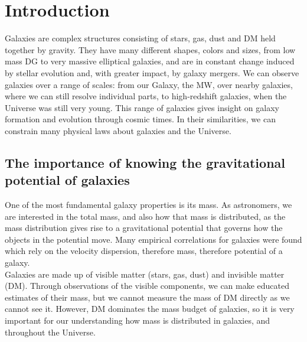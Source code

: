 \section{Introduction}\label{sec:Intro}
Galaxies are complex structures consisting of stars, gas, dust and \ac{DM} held together by gravity. They have many different shapes, colors and sizes, from low mass \ac{DG} to very massive elliptical galaxies, and are in constant change induced by stellar evolution and, with greater impact, by galaxy mergers. We can observe galaxies over a range of scales: from our Galaxy, the \ac{MW}, over nearby galaxies, where we can still resolve individual parts, to high-redshift galaxies, when the Universe was still very young. This range of galaxies gives insight on galaxy formation and evolution through cosmic times. In their similarities, we can constrain many physical laws about galaxies and the Universe. 

\subsection{The importance of knowing the gravitational potential of galaxies}
One of the most fundamental galaxy properties is its mass. As astronomers, we are interested in the total mass, and also how that mass is distributed, as the mass distribution gives rise to a gravitational potential that governs how the objects in the potential move. Many empirical correlations for galaxies were found which rely on the velocity dispersion, therefore mass, therefore potential of a galaxy. \\
Galaxies are made up of visible matter (stars, gas, dust) and invisible matter (\ac{DM}). Through observations of the visible components, we can make educated estimates of their mass, but we cannot measure the mass of \ac{DM} directly as we cannot see it. However, \ac{DM} dominates the mass budget of galaxies, so it is very important for our understanding how mass is distributed in galaxies, and throughout the Universe.

